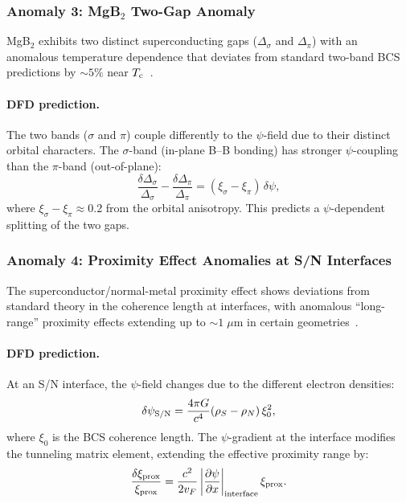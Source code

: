 \documentclass[aps,prb,twocolumn,superscriptaddress,floatfix,nofootinbib,longbibliography]{revtex4-2}
\newcommand{\Tc}{T_{\rm c}}
\begin{document}
\subsubsection{Anomaly 3: MgB$_2$ Two-Gap Anomaly}

MgB$_2$ exhibits two distinct superconducting gaps ($\Delta_\sigma$
and $\Delta_\pi$) with an anomalous temperature dependence that deviates
from standard two-band BCS predictions by $\sim 5\%$ near
$\Tc$~\cite{Choi2002,Iavarone2002}.

\paragraph{DFD prediction.}
The two bands ($\sigma$ and $\pi$) couple differently to the $\psi$-field
due to their distinct orbital characters.  The $\sigma$-band (in-plane
B--B bonding) has stronger $\psi$-coupling than the $\pi$-band
(out-of-plane):
\begin{equation}
\frac{\delta\Delta_\sigma}{\Delta_\sigma} - \frac{\delta\Delta_\pi}{\Delta_\pi}
= (\xi_\sigma - \xi_\pi)\,\delta\psi,
\label{eq:mgb2-pred}
\end{equation}
where $\xi_\sigma - \xi_\pi \approx 0.2$ from the orbital anisotropy.
This predicts a $\psi$-dependent splitting of the two gaps.

\subsubsection{Anomaly 4: Proximity Effect Anomalies at S/N Interfaces}

The superconductor/normal-metal proximity effect shows deviations from
standard theory in the coherence length at interfaces, with
anomalous ``long-range'' proximity effects extending up to
$\sim 1\;\mu$m in certain geometries~\cite{Buzdin2005,Bergeret2005}.

\paragraph{DFD prediction.}
At an S/N interface, the $\psi$-field changes due to the different
electron densities:
\begin{equation}
\delta\psi_{\rm S/N} = \frac{4\pi G}{c^4}(\rho_S - \rho_N)\,\xi_0^2,
\label{eq:prox-psi}
\end{equation}
where $\xi_0$ is the BCS coherence length.  The $\psi$-gradient at the
interface modifies the tunneling matrix element, extending the effective
proximity range by:
\begin{equation}
\frac{\delta\xi_{\rm prox}}{\xi_{\rm prox}} = \frac{c^2}{2v_F}
\left|\frac{\partial\psi}{\partial x}\right|_{\rm interface}\xi_{\rm prox}.
\label{eq:prox-range}
\end{equation}
\end{document}

